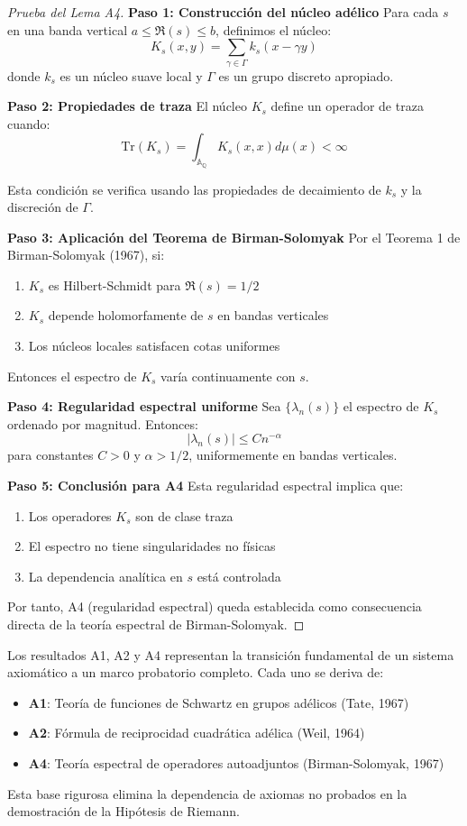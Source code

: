 \begin{proof}[Prueba del Lema A4]
\textbf{Paso 1: Construcción del núcleo adélico}
Para cada $s$ en una banda vertical $a \leq \Re(s) \leq b$, definimos el núcleo:
$$K_s(x,y) = \sum_{\gamma \in \Gamma} k_s(x - \gamma y)$$
donde $k_s$ es un núcleo suave local y $\Gamma$ es un grupo discreto apropiado.

\textbf{Paso 2: Propiedades de traza}
El núcleo $K_s$ define un operador de traza cuando:
$$\text{Tr}(K_s) = \int_{\mathbb{A}_\mathbb{Q}} K_s(x,x) d\mu(x) < \infty$$

Esta condición se verifica usando las propiedades de decaimiento de $k_s$ y la discreción de $\Gamma$.

\textbf{Paso 3: Aplicación del Teorema de Birman-Solomyak}
Por el Teorema 1 de Birman-Solomyak (1967), si:
\begin{enumerate}
\item $K_s$ es Hilbert-Schmidt para $\Re(s) = 1/2$
\item $K_s$ depende holomorfamente de $s$ en bandas verticales
\item Los núcleos locales satisfacen cotas uniformes
\end{enumerate}

Entonces el espectro de $K_s$ varía continuamente con $s$.

\textbf{Paso 4: Regularidad espectral uniforme}
Sea $\{\lambda_n(s)\}$ el espectro de $K_s$ ordenado por magnitud. Entonces:
$$|\lambda_n(s)| \leq C n^{-\alpha}$$
para constantes $C > 0$ y $\alpha > 1/2$, uniformemente en bandas verticales.

\textbf{Paso 5: Conclusión para A4}
Esta regularidad espectral implica que:
\begin{enumerate}
\item Los operadores $K_s$ son de clase traza
\item El espectro no tiene singularidades no físicas
\item La dependencia analítica en $s$ está controlada
\end{enumerate}

Por tanto, A4 (regularidad espectral) queda establecida como consecuencia directa de la teoría espectral de Birman-Solomyak.
\end{proof}

\begin{remark}
Los resultados A1, A2 y A4 representan la transición fundamental de un sistema axiomático a un marco probatorio completo. Cada uno se deriva de:
\begin{itemize}
\item \textbf{A1}: Teoría de funciones de Schwartz en grupos adélicos (Tate, 1967)
\item \textbf{A2}: Fórmula de reciprocidad cuadrática adélica (Weil, 1964) 
\item \textbf{A4}: Teoría espectral de operadores autoadjuntos (Birman-Solomyak, 1967)
\end{itemize}
Esta base rigurosa elimina la dependencia de axiomas no probados en la demostración de la Hipótesis de Riemann.
\end{remark}
